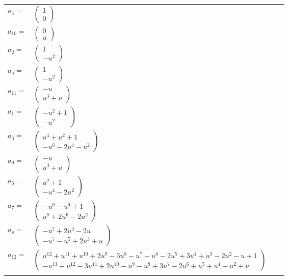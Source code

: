 \documentclass[1p]{elsarticle_modified}
\theoremstyle{definition}
\begin{document}
\begin{tabular}{m{7pt} m{180pt} m{7pt} m{180pt} }
\flushright $a_{4}=$&$\begin{pmatrix}1\\0\end{pmatrix}$ \\
\flushright $a_{10}=$&$\begin{pmatrix}0\\u\end{pmatrix}$ \\
\flushright $a_{2}=$&$\begin{pmatrix}1\\- u^2\end{pmatrix}$ \\
\flushright $a_{5}=$&$\begin{pmatrix}1\\- u^2\end{pmatrix}$ \\
\flushright $a_{11}=$&$\begin{pmatrix}- u\\u^3+u\end{pmatrix}$ \\
\flushright $a_{1}=$&$\begin{pmatrix}- u^2+1\\- u^2\end{pmatrix}$ \\
\flushright $a_{3}=$&$\begin{pmatrix}u^4+u^2+1\\- u^6-2 u^4- u^2\end{pmatrix}$ \\
\flushright $a_{9}=$&$\begin{pmatrix}- u\\u^3+u\end{pmatrix}$ \\
\flushright $a_{6}=$&$\begin{pmatrix}u^2+1\\- u^4-2 u^2\end{pmatrix}$ \\
\flushright $a_{7}=$&$\begin{pmatrix}- u^6- u^4+1\\u^8+2 u^6-2 u^2\end{pmatrix}$ \\
\flushright $a_{8}=$&$\begin{pmatrix}- u^7+2 u^3-2 u\\- u^7- u^5+2 u^3+u\end{pmatrix}$ \\
\flushright $a_{12}=$&$\begin{pmatrix}u^{12}+u^{11}+u^{10}+2 u^9-3 u^8- u^7- u^6-2 u^5+3 u^4+u^3-2 u^2- u+1\\- u^{13}+u^{12}-3 u^{11}+2 u^{10}- u^9- u^8+3 u^7-2 u^6+u^5+u^4- u^2+u\end{pmatrix}$\\&\end{tabular}
\end{document}
